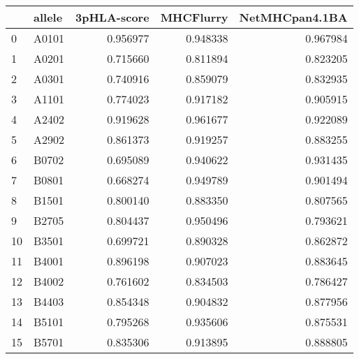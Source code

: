 \begin{tabular}{llrrr}
\toprule
{} & allele &  3pHLA-score &  MHCFlurry &  NetMHCpan4.1BA \\
\midrule
0  &  A0101 &     0.956977 &   0.948338 &        0.967984 \\
1  &  A0201 &     0.715660 &   0.811894 &        0.823205 \\
2  &  A0301 &     0.740916 &   0.859079 &        0.832935 \\
3  &  A1101 &     0.774023 &   0.917182 &        0.905915 \\
4  &  A2402 &     0.919628 &   0.961677 &        0.922089 \\
5  &  A2902 &     0.861373 &   0.919257 &        0.883255 \\
6  &  B0702 &     0.695089 &   0.940622 &        0.931435 \\
7  &  B0801 &     0.668274 &   0.949789 &        0.901494 \\
8  &  B1501 &     0.800140 &   0.883350 &        0.807565 \\
9  &  B2705 &     0.804437 &   0.950496 &        0.793621 \\
10 &  B3501 &     0.699721 &   0.890328 &        0.862872 \\
11 &  B4001 &     0.896198 &   0.907023 &        0.883645 \\
12 &  B4002 &     0.761602 &   0.834503 &        0.786427 \\
13 &  B4403 &     0.854348 &   0.904832 &        0.877956 \\
14 &  B5101 &     0.795268 &   0.935606 &        0.875531 \\
15 &  B5701 &     0.835306 &   0.913895 &        0.888805 \\
\bottomrule
\end{tabular}
